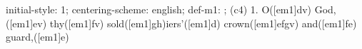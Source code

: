 initial-style: 1;
centering-scheme: english;
def-m1: \grealign;
(c4) 1. O([em1]dv) God, ([em1]ev) thy([em1]fv) sold([em1]gh)iers'([em1]d) crown([em1]efgv) and([em1]fe) guard,([em1]e)